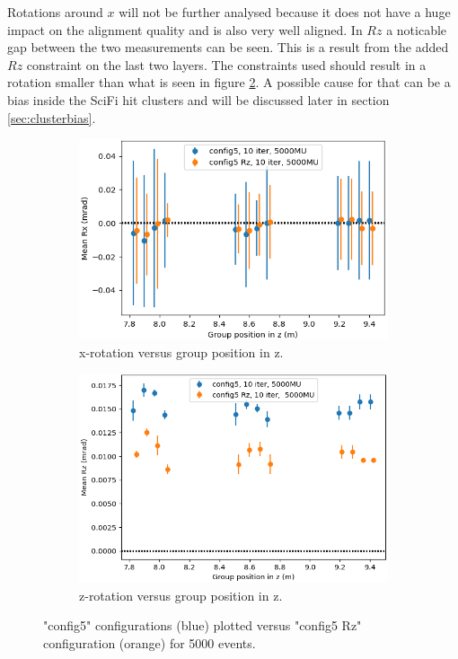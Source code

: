 Rotations around $x$ will not be further analysed because it does not have a huge impact on the alignment quality and is also very well aligned. In $Rz$ a noticable gap
between the two measurements can be seen. This is a result from the added $Rz$ constraint on the last two layers.
The constraints used should result in a rotation smaller than what is seen in figure \ref{fig:config5_Rz}.
A possible cause for that can be a bias inside the SciFi hit clusters and will be discussed later in section \ref{sec:clusterbias}.

\begin{figure}
  \centering
  \begin{subfigure}[b]{0.48\textwidth}
    \centering
    \includegraphics[width=\textwidth]{plots/renewed_plots/Rx_config5.png}
    \caption{x-rotation versus group position in z.}
    \label{fig:config5_Rx}
  \end{subfigure}
  \hfill
  \begin{subfigure}[b]{0.48\textwidth}
    \centering
    \includegraphics[width=\textwidth]{plots/renewed_plots/Rz_config5.png}
    \caption{z-rotation versus group position in z.}
    \label{fig:config5_Rz}
  \end{subfigure}
  \caption{"config5" configurations (blue) plotted versus "config5 Rz" configuration (orange) for 5000 events.}
  \label{fig:config5_rot}
\end{figure}

